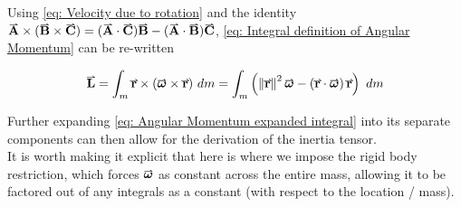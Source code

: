 \documentclass[main.tex]{subfiles}
\begin{document}
                    Using \eqref{eq: Velocity due to rotation} and the identity $\vect{A} \times (\vect{B} \times \vect{C}) = (\vect{A}\cdot\vect{C})\vect{B} - (\vect{A}\cdot\vect{B})\vect{C}$, \eqref{eq: Integral definition of Angular Momentum} can be re-written

                    \begin{equation}
                        \vect{L} = \int_m \vect{r} \times (\vect{\omega} \times \vect{r}) \ud m = \int_m \left(\vmod{\vect{r}}^2\vect{\omega} - \left(\vect{r}\cdot\vect{\omega}\right)\vect{r} \right)\ud m
                        \label{eq: Angular Momentum expanded integral}
                    \end{equation}

                    Further expanding \eqref{eq: Angular Momentum expanded integral} into its separate components can then allow for the derivation of the inertia tensor.\\
                    It is worth making it explicit that here is where we impose the rigid body restriction, which forces $\vect{\omega}$ as constant across the entire mass, allowing it to be factored out of any integrals as a constant (with respect to the location / mass).
\end{document}
